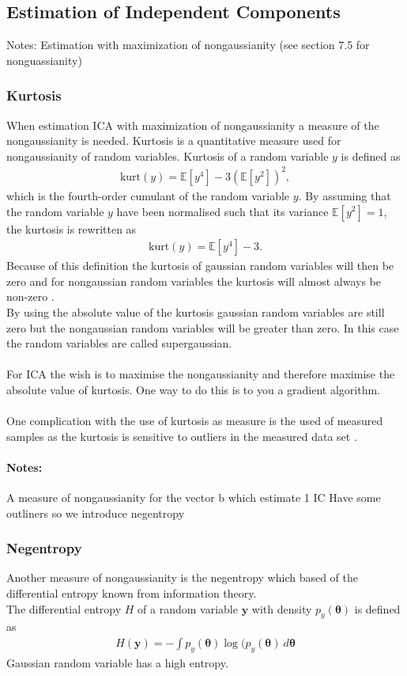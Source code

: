 \subsection{Estimation of Independent Components}
Notes:
Estimation with maximization of nongaussianity (see section 7.5 for nonguassianity)


\subsubsection{Kurtosis}
When estimation ICA with maximization of nongaussianity a measure of the nongaussianity is needed. Kurtosis is a quantitative measure used for nongaussianity of random variables. Kurtosis of a random variable $y$ is defined as
\begin{align*}
\text{kurt} (y) = \mathbb{E}[y^4] - 3 ( \mathbb{E}[y^2])^2,
\end{align*}
which is the fourth-order cumulant of the random variable $y$. By assuming that the random variable $y$ have been normalised such that its variance $\mathbb{E}[y^2] = 1$, the kurtosis is rewritten as
\begin{align*}
\text{kurt} (y) = \mathbb{E}[y^4] - 3.
\end{align*}
Because of this definition the kurtosis of gaussian random variables will then be zero and for nongaussian random variables the kurtosis will almost always be non-zero \cite[p. 171]{ICA}.
\\
By using the absolute value of the kurtosis gaussian random variables are still zero but the nongaussian random variables will be greater than zero. In this case the random variables are called supergaussian.
\\ \\
For ICA the wish is to maximise the nongaussianity and therefore maximise the absolute value of kurtosis. One way to do this is to you a gradient algorithm.
\\ \\
One complication with the use of kurtosis as measure is the used of measured samples as the kurtosis is sensitive to outliers in the measured data set \cite[p. 182]{ICA}. 

\paragraph{Notes:}
A measure of nongaussianity for the vector b which estimate 1 IC
Have some outliners so we introduce negentropy

\subsubsection{Negentropy}
Another measure of nongaussianity is the negentropy which based of the differential entropy known from information theory.
\\
The differential entropy $H$ of a random variable $\mathbf{y}$ with density $p_y (\boldsymbol{\theta})$ is defined as
\begin{align*}
H(\mathbf{y}) = - \int p_y (\boldsymbol{\theta}) \log (p_y (\boldsymbol{\theta}) \ d\boldsymbol{\theta}
\end{align*}
Gaussian random variable has a high entropy.


